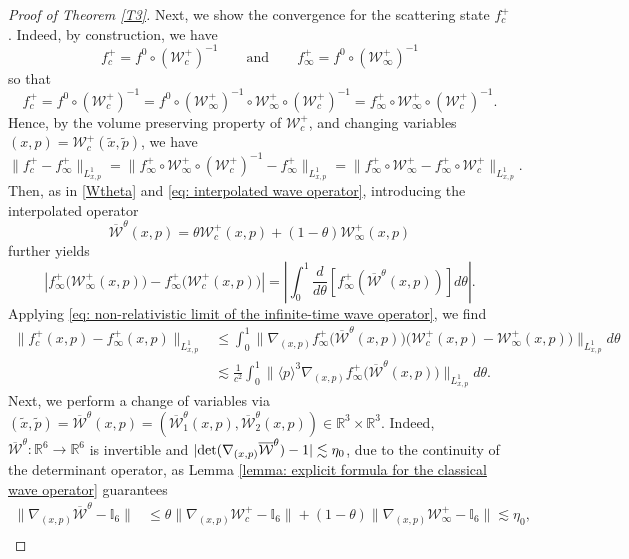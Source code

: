 \documentclass[reqno, 11pt, letterpaper]{amsart}
\theoremstyle{remark}
\numberwithin{equation}{section}
\numberwithin{theorem}{section}
\numberwithin{table}{section}
\numberwithin{figure}{section}
\begin{document}
\begin{proof}[Proof of Theorem \ref{T3}]
Next, we show the convergence for the scattering state $f_c^+$. Indeed, by construction, we have
$$f_c^+=f^0\circ (\mathcal{W}_c^+)^{-1} \qquad \mathrm{and} \qquad f_\infty^+=f^0\circ (\mathcal{W}_\infty^+)^{-1} $$
so that
$$f_c^+=f^0\circ (\mathcal{W}_c^+)^{-1}=f^0\circ(\mathcal{W}_\infty^+)^{-1}\circ\mathcal{W}_\infty^+\circ(\mathcal{W}_c^+)^{-1}=f_\infty^+\circ\mathcal{W}_\infty^+\circ(\mathcal{W}_c^+)^{-1}.$$
Hence, by the volume preserving property of $\mathcal{W}_c^+$, and changing variables $(x,p)=\mathcal{W}_c^+(\tilde{x},\tilde{p})$, we have
$$\|f_c^+-f_\infty^+\|_{L_{x,p}^1}=\|f_\infty^+\circ\mathcal{W}_\infty^+\circ(\mathcal{W}_c^+)^{-1}-f_\infty^+\|_{L_{x,p}^1}=\|f_\infty^+\circ \mathcal{W}_\infty^+-f_\infty^+\circ\mathcal{W}_c^+\|_{L_{x,p}^1}.$$
Then, as in \eqref{Wtheta} and \eqref{eq: interpolated wave operator}, introducing the interpolated operator
$$\overline{\mathcal{W}}^\theta(x,p)=\theta\mathcal{W}_c^+(x,p)+(1-\theta)\mathcal{W}_\infty^+(x,p)$$
further yields
$$ \left |f^+_\infty \Big( \mathcal{W}_\infty^+(x,p) \Big)  - f^+_\infty \Big( \mathcal{W}_c^+(x,p)\Big) \right | 
= \left |\int_0^1 \frac{d}{d\theta} \left [f_\infty^+ \left (\overline{\mathcal{W}}^\theta(x,p) \right ) \right ] d \theta \right |.$$
Applying \eqref{eq: non-relativistic limit of the infinite-time wave operator}, we find
$$\begin{aligned}
\|f_c^+(x,p)-f_\infty^+(x,p)\|_{L_{x,p}^1}&\leq\int_0^1\Big\|\nabla_{(x,p)}f_\infty^+\Big(\overline{\mathcal{W}}^\theta(x,p)\Big)\Big(\mathcal{W}_c^+(x,p)-\mathcal{W}_\infty^+(x,p)\Big)\Big\|_{L_{x,p}^1}d\theta\\
&\lesssim\frac{1}{c^2}\int_0^1\Big\|\langle p \rangle^3 \nabla_{(x,p)}f_\infty^+\Big(\overline{\mathcal{W}}^\theta(x,p)\Big)\Big\|_{L_{x,p}^1}  d\theta.
\end{aligned}$$
Next, we perform a change of variables via $(\tilde{x},\tilde{p})=\overline{\mathcal{W}}^\theta(x,p)=(\overline{\mathcal{W}}_1^\theta(x,p), \overline{\mathcal{W}}_2^\theta(x,p))\in \mathbb{R}^3\times\mathbb{R}^3$. Indeed, $\overline{\mathcal{W}}^\theta:\mathbb{R}^6\to\mathbb{R}^6$ is invertible and $|\textup{det}(\nabla_{(x,p)}\overline{\mathcal{W}}^\theta)-1|\lesssim\eta_0$, due to the continuity of the determinant operator, as Lemma \ref{lemma: explicit formula for the classical wave operator} guarantees
$$\begin{aligned}
\|\nabla_{(x,p)}\overline{\mathcal{W}}^\theta-\mathbb{I}_6\|&\leq\theta \|\nabla_{(x,p)}\mathcal{W}_c^+-\mathbb{I}_6\|+(1-\theta)\|\nabla_{(x,p)}\mathcal{W}_\infty^+-\mathbb{I}_6\|\lesssim\eta_0,\\

\end{aligned}$$
\end{proof}
\end{document}
